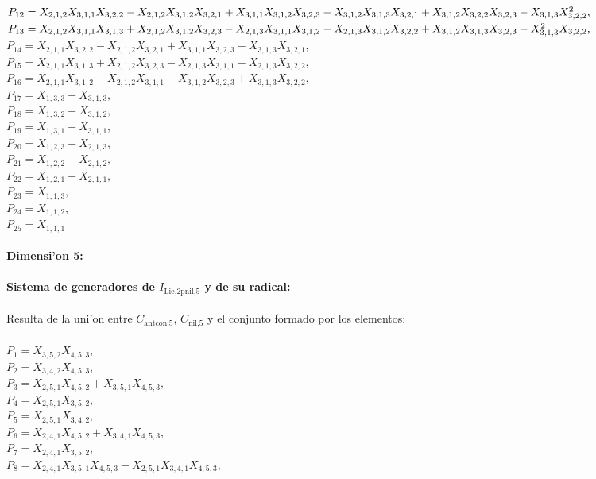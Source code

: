 \documentclass[10pt]{beamer}
\begin{document}
{$P_{12}=X_{2,1,2}X_{3,1,1}X_{3,2,2}-X_{2,1,2}X_{3,1,2}X_{3,2,1}+X_{3,1,1}X_{3,1,2}X_{3,2,3}-\\
X_{3,1,2}X_{3,1,3}X_{3,2,1}+X_{3,1,2}X_{3,2,2}X_{3,2,3}-X_{3,1,3}X_{3,2,2}^2,$\\
$P_{13}=X_{2,1,2}X_{3,1,1}X_{3,1,3}+X_{2,1,2}X_{3,1,2}X_{3,2,3}-X_{2,1,3}X_{3,1,1}X_{3,1,2}-\\
X_{2,1,3}X_{3,1,2}X_{3,2,2}+X_{3,1,2}X_{3,1,3}X_{3,2,3}-X_{3,1,3}^2X_{3,2,2},$\\
$P_{14}=X_{2,1,1}X_{3,2,2}-X_{2,1,2}X_{3,2,1}+X_{3,1,1}X_{3,2,3}-X_{3,1,3}X_{3,2,1},$\\
$P_{15}=X_{2,1,1}X_{3,1,3}+X_{2,1,2}X_{3,2,3}-X_{2,1,3}X_{3,1,1}-X_{2,1,3}X_{3,2,2},$\\
$P_{16}=X_{2,1,1}X_{3,1,2}-X_{2,1,2}X_{3,1,1}-X_{3,1,2}X_{3,2,3}+X_{3,1,3}X_{3,2,2},$\\
$P_{17}=X_{1,3,3}+X_{3,1,3},$\\
$P_{18}=X_{1,3,2}+X_{3,1,2},$\\
$P_{19}=X_{1,3,1}+X_{3,1,1},$\\
$P_{20}=X_{1,2,3}+X_{2,1,3},$\\
$P_{21}=X_{1,2,2}+X_{2,1,2},$\\
$P_{22}=X_{1,2,1}+X_{2,1,1},$\\
$P_{23}=X_{1,1,3},$\\
$P_{24}=X_{1,1,2},$\\
$P_{25}=X_{1,1,1}$\\
\\
\textbf{Dimensi'on 5:}\\
\\
\textbf{Sistema de generadores de $I_{\text{Lie,2pnil,}5}$ y de su radical:}\\
\\
Resulta de la uni'on entre $C_{\text{antcon,}5}$, $C_{\text{nil,}5}$ y el conjunto formado por los elementos:\\
\\
$P_{1}=X_{3,5,2}X_{4,5,3},$\\
$P_{2}=X_{3,4,2}X_{4,5,3},$\\
$P_{3}=X_{2,5,1}X_{4,5,2}+X_{3,5,1}X_{4,5,3},$\\
$P_{4}=X_{2,5,1}X_{3,5,2},$\\
$P_{5}=X_{2,5,1}X_{3,4,2},$\\
$P_{6}=X_{2,4,1}X_{4,5,2}+X_{3,4,1}X_{4,5,3},$\\
$P_{7}=X_{2,4,1}X_{3,5,2},$\\
$P_{8}=X_{2,4,1}X_{3,5,1}X_{4,5,3}-X_{2,5,1}X_{3,4,1}X_{4,5,3},$\\
}
\end{document}
